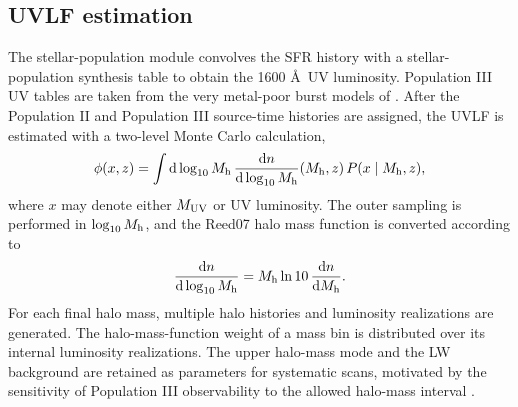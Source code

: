 \documentclass[twocolumn,times]{aastex701}
\begin{document}
\subsection{UVLF estimation}\label{subsec:uvlf}

The stellar-population module convolves the SFR history with a stellar-population synthesis table to obtain the 1600 \AA\ UV luminosity. Population III UV tables are taken from the very metal-poor burst models of \citet{Raiter2010}. After the Population II and Population III source-time histories are assigned, the UVLF is estimated with a two-level Monte Carlo calculation,
\begin{equation}
  \phi(x,z) =
  \int \mathrm{d}\log_{10}M_{\rm h}\,
  \frac{\mathrm{d} n}{\mathrm{d}\log_{10}M_{\rm h}}(M_{\rm h},z)\,
  P(x\mid M_{\rm h},z),
\end{equation}
where $x$ may denote either $M_{\rm UV}$ or UV luminosity. The outer sampling is performed in $\log_{10}M_{\rm h}$, and the Reed07 halo mass function \citep{Reed2007} is converted according to
\begin{equation}
  \frac{\mathrm{d} n}{\mathrm{d}\log_{10}M_{\rm h}}
  = M_{\rm h}\ln 10\,\frac{\mathrm{d} n}{\mathrm{d}M_{\rm h}}.
\end{equation}
For each final halo mass, multiple halo histories and luminosity realizations are generated. The halo-mass-function weight of a mass bin is distributed over its internal luminosity realizations. The upper halo-mass mode and the LW background are retained as parameters for systematic scans, motivated by the sensitivity of Population III observability to the allowed halo-mass interval \citep{Visbal2015,Visbal2017}.
\end{document}
